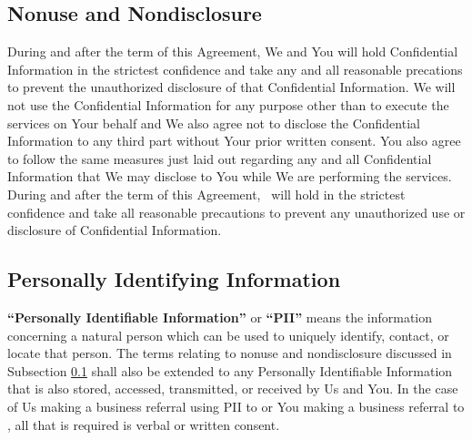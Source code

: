 {    \subsection{Nonuse and Nondisclosure}\label{nondisclosure}
    During and after the term of this Agreement, We and You will hold Confidential Information in the strictest confidence and take any and all reasonable precations to prevent the unauthorized disclosure of that Confidential Information. We will not use the Confidential Information for any purpose other than to execute the services on Your behalf and We also agree not to disclose the Confidential Information to any third part without Your prior written consent. You also agree to follow the same measures just laid out regarding any and all Confidential Information that We may disclose to You while We are performing the services.
    During and after the term of this Agreement, \ will hold in the strictest confidence and take all reasonable precautions to prevent any unauthorized use or disclosure of Confidential Information.

    \subsection{Personally Identifying Information}
    \textbf{``Personally Identifiable Information''} or \textbf{``PII''} means the information concerning a natural person which can be used to uniquely identify, contact, or locate that person. The terms relating to nonuse and nondisclosure discussed in Subsection \ref{nondisclosure} shall also be extended to any Personally Identifiable Information that is also stored, accessed, transmitted, or received by Us and You. In the case of Us making a business referral using PII to \clientbusinessname or You making a business referral to \ludu, all that is required is verbal or written consent.
}

